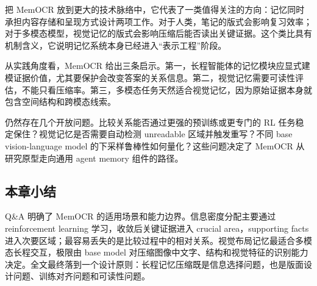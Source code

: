 把 MemOCR 放到更大的技术脉络中，它代表了一类值得关注的方向：记忆同时承担内容存储和呈现方式设计两项工作。对于人类，笔记的版式会影响复习效率；对于多模态模型，视觉记忆的版式会影响压缩后能否读出关键证据。这个类比具有机制含义，它说明记忆系统本身已经进入“表示工程”阶段。

从实践角度看，MemOCR 给出三条启示。第一，长程智能体的记忆模块应显式建模证据价值，尤其要保护会改变答案的关系信息。第二，视觉记忆需要可读性评估，不能只看压缩率。第三，多模态任务天然适合视觉记忆，因为原始证据本身就包含空间结构和跨模态线索。

仍然存在几个开放问题。比较关系能否通过更强的预训练或更专门的 RL 任务稳定保住？视觉记忆是否需要自动检测 unreadable 区域并触发重写？不同 base vision-language model 的下采样鲁棒性如何量化？这些问题决定了 MemOCR 从研究原型走向通用 agent memory 组件的路径。

\subsection{本章小结}

Q\&A 明确了 MemOCR 的适用场景和能力边界。信息密度分配主要通过 reinforcement learning 学习，收敛后关键证据进入 crucial area，supporting facts 进入次要区域；最容易丢失的是比较过程中的相对关系。视觉布局记忆最适合多模态长程交互，极限由 base model 对压缩图像中文字、结构和视觉特征的识别能力决定。全文最终落到一个设计原则：长程记忆压缩既是信息选择问题，也是版面设计问题、训练对齐问题和可读性问题。
